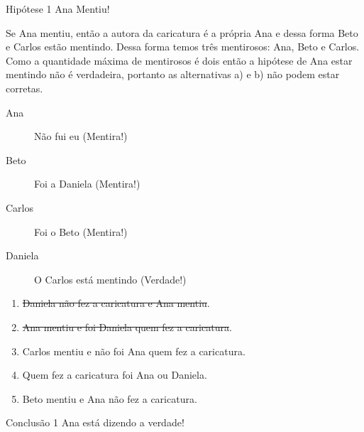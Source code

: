 \documentclass[10pt,aspectratio=169]{beamer}
\begin{document}
\begin{frame}[t]
	\footnotesize
	\begin{resultado}{Hipótese 1}
		Ana Mentiu!
	\end{resultado}
	Se Ana mentiu, então a autora da caricatura é a própria Ana e dessa forma Beto e Carlos estão mentindo. Dessa forma temos três mentirosos: Ana, Beto e Carlos. Como a quantidade máxima de mentirosos é dois então a hipótese de Ana estar mentindo não é verdadeira, portanto as alternativas a) e b) não podem estar corretas.
	\begin{description}
		\item[Ana] Não fui eu \alert{(Mentira!)}
		\item[Beto] Foi a Daniela \alert{(Mentira!)}
		\item[Carlos] Foi o Beto \alert{(Mentira!)}
		\item[Daniela] O Carlos está mentindo \alert{(Verdade!)}
	\end{description}
	\hrulefill
	\begin{enumerate}[a]
		\item \sout{Daniela não fez a caricatura e Ana mentiu}.
		\item \sout{Ana mentiu e foi Daniela quem fez a caricatura}.
		\item Carlos mentiu e não foi Ana quem fez a caricatura.
		\item Quem fez a caricatura foi Ana ou Daniela.
		\item Beto mentiu e Ana não fez a caricatura.
	\end{enumerate}
	\begin{conclusao}{Conclusão 1}
		Ana está dizendo a verdade!
	\end{conclusao}
\end{frame}
\end{document}
